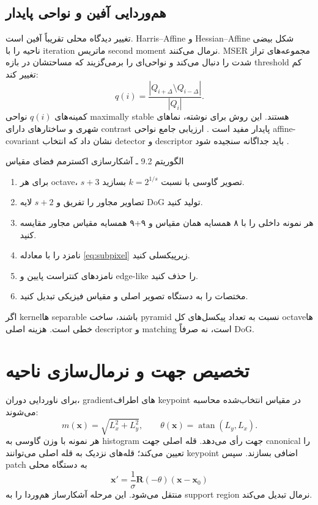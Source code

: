 \documentclass[12pt,openany,oneside]{book}
\newcommand{\vect}[1]{\bm{#1}}
\newcommand{\mat}[1]{\bm{#1}}
\begin{document}
\subsection{هم‌وردایی آفین و نواحی پایدار}
تغییر دیدگاه محلی تقریباً آفین است. Harris--Affine و Hessian--Affine شکل بیضی ناحیه را با iteration ماتریس second moment
نرمال می‌کنند. MSER مجموعه‌های تراز شدت را دنبال می‌کند و نواحی‌ای را برمی‌گزیند که مساحتشان در بازه threshold کم تغییر کند:
\begin{equation}
q(i)=\frac{|Q_{i+\Delta}\setminus Q_{i-\Delta}|}{|Q_i|}.
\end{equation}
کمینه‌های $q(i)$ نواحی maximally stable هستند. این روش برای نوشته، نماهای شهری و ساختارهای دارای contrast پایدار مفید است
\cite{matas2004}. ارزیابی جامع نواحی affine-covariant نشان داد که انتخاب detector و descriptor باید جداگانه سنجیده شود
\cite{mikolajczyk2005,mikolajczyk2006}.

\begin{algorithmbox}{الگوریتم 9.2 ـ آشکارسازی اکسترمم فضای مقیاس}
\begin{enumerate}
\item برای هر octave، $s+3$ تصویر گاوسی با نسبت $k=2^{1/s}$ بسازید.
\item تصاویر مجاور را تفریق و $s+2$ لایه DoG تولید کنید.
\item هر نمونه داخلی را با ۸ همسایه همان مقیاس و ۹+۹ همسایه مقیاس مجاور مقایسه کنید.
\item نامزد را با معادله \eqref{eq:subpixel} زیرپیکسلی کنید.
\item نامزدهای کنتراست پایین و edge-like را حذف کنید.
\item مختصات را به دستگاه تصویر اصلی و مقیاس فیزیکی تبدیل کنید.
\end{enumerate}
اگر kernelها separable باشند، ساخت pyramid نسبت به تعداد پیکسل‌های کل octaveها خطی است. هزینه اصلی descriptor و matching است، نه صرفاً DoG.
\end{algorithmbox}

\section{تخصیص جهت و نرمال‌سازی ناحیه}
برای ناوردایی دوران، gradientهای اطراف keypoint در مقیاس انتخاب‌شده محاسبه می‌شوند:
\begin{equation}
m(\vect x)=\sqrt{L_x^2+L_y^2},\qquad
\theta(\vect x)=\operatorname{atan}(L_y,L_x).
\end{equation}
هر نمونه با وزن گاوسی به histogram جهت رأی می‌دهد. قله اصلی جهت canonical را تعیین می‌کند؛ قله‌های نزدیک به قله اصلی می‌توانند
keypoint اضافی بسازند. سپس patch به دستگاه محلی
\begin{equation}
\vect x'=\frac{1}{\sigma}\mat R(-\theta)(\vect x-\vect x_0)
\end{equation}
منتقل می‌شود. این مرحله آشکارساز هم‌وردا را به support region نرمال تبدیل می‌کند.
\end{document}
